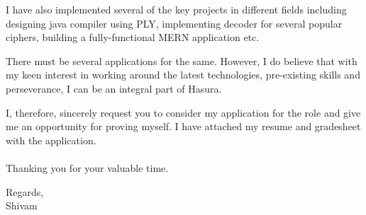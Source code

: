 \documentclass[12pt, a4paper]{awesome-cv}
\begin{document}
	
	I have also implemented several of the key projects in different fields including designing java compiler using PLY, implementing decoder for several popular ciphers, building a fully-functional MERN application etc.
%	
%	

	There must be several applications for the same. However, I do believe that with my keen interest in working around the latest technologies, pre-existing skills and perseverance, I can be an integral part of Hasura.
	
	I, therefore, sincerely request you to consider my application for the role and give me an opportunity for proving myself. I have attached my resume and gradesheet with the application.\\\\
	
	Thanking you for your valuable time.
	
	Regards,\\
	Shivam
	
	
	
%
%
%
%
%
%
%
% 
\end{document}
